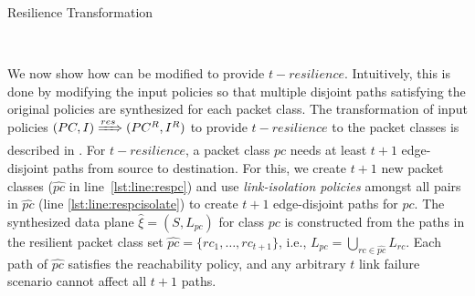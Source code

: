 \begin{algorithm}[h]
	\begin{footnotesize}
		\caption{Resilience Transformation}
		\label{restransform}
		\begin{algorithmic}[1]
			\vspace*{0.25cm}
			 \label{lst:line:respc}
			  \label{lst:line:respcisolate}
			 \label{lst:line:respcend}
			\EndFor
			 \label{lst:line:respolicy}
			\EndFor \\
		\end{algorithmic}
	\end{footnotesize}
\end{algorithm}

We now show how \Name can be modified to provide $t-resilience$.
Intuitively, this  is done by modifying the input policies so that  multiple disjoint paths satisfying the original
policies are synthesized for each packet class.
\noindent The transformation of input policies $(PC, I) \xRightarrow{res} (PC^R, I^R)$
to provide $t-resilience$ to the packet classes is described in . 
For $t-resilience$, a packet class $pc$ needs at least $t+1$ edge-disjoint paths from
source to destination. For this, we create $t+1$ new packet classes ($\hat{pc}$ in line~\ref{lst:line:respc})
and use {\em link-isolation policies} amongst all pairs in $\hat{pc}$ (line \ref{lst:line:respcisolate})
to create $t+1$ edge-disjoint paths for $pc$.
The synthesized data plane $\hat{\xi} = (S, L_{pc})$ for class $pc$ is constructed from the 
paths in the resilient packet class set $\hat{pc} = \{rc_1,\ldots,rc_{t+1}\}$,
i.e., $L_{pc} = \bigcup\limits_{rc \in \hat{pc}} L_{rc}$.  
Each path of $\hat{pc}$ satisfies the reachability policy, 
and any arbitrary $t$ link failure scenario cannot affect all $t+1$ paths.

